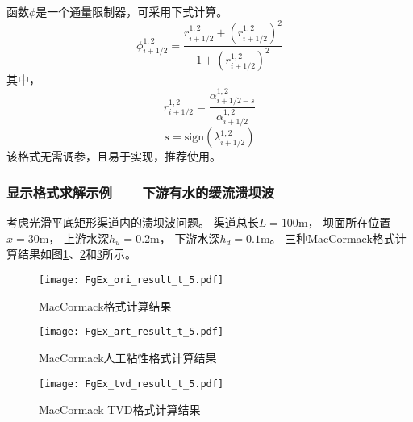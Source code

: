 函数$\phi$是一个通量限制器，可采用下式计算。
\begin{equation}
\phi_{i+1/2}^{1,2} =
\frac{r_{i+1/2}^{1,2}+(r_{i+1/2}^{1,2})^{2}}{1+(r_{i+1/2}^{1,2})^{2}}
\end{equation}
其中，
\begin{equation}
r_{i+1/2}^{1,2} =
\frac{\alpha_{i+1/2-s}^{1,2}}{\alpha_{i+1/2}^{1,2}}
\end{equation}
\begin{equation}
s = 
\mathrm{sign}
\left(
  \lambda_{i+1/2}^{1,2}
\right)
\end{equation}
该格式无需调参，且易于实现，推荐使用。



\subsubsection{显示格式求解示例——下游有水的缓流溃坝波}
考虑光滑平底矩形渠道内的溃坝波问题。
渠道总长$L=100\mathrm{m}$，
坝面所在位置$x=30\mathrm{m}$，
上游水深$h_{u}=0.2\mathrm{m}$，
下游水深$h_{d}=0.1\mathrm{m}$。
三种MacCormack格式计算结果如图\ref{FgEx_ori_result_t_5}、\ref{FgEx_art_result_t_5}和\ref{FgEx_tvd_result_t_5}所示。
\begin{figure}[!htb]
  \centering
  \texttt{[image: FgEx\_ori\_result\_t\_5.pdf]}
  \caption{MacCormack格式计算结果}
  \label{FgEx_ori_result_t_5}
\end{figure}
\begin{figure}[!htb]
  \centering
  \texttt{[image: FgEx\_art\_result\_t\_5.pdf]}
  \caption{MacCormack人工粘性格式计算结果}
  \label{FgEx_art_result_t_5}
\end{figure}
\begin{figure}[!htb]
  \centering
  \texttt{[image: FgEx\_tvd\_result\_t\_5.pdf]}
  \caption{MacCormack TVD格式计算结果}
  \label{FgEx_tvd_result_t_5}
\end{figure}


